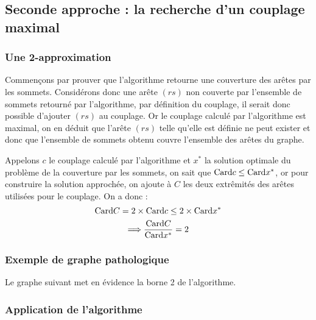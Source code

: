 \subsection{Seconde approche : la recherche d'un couplage maximal}

\subsubsection{Une 2-approximation}

Commençons par prouver que l'algorithme retourne une couverture des arêtes par les sommets.
Considérons donc une arête $(rs)$ non couverte par l'ensemble de sommets retourné par l'algorithme, par
définition du couplage, il serait donc possible d'ajouter $(rs)$ au couplage. Or le couplage calculé
par l'algorithme est maximal, on en déduit que l'arête $(rs)$ telle qu'elle est définie ne peut
exister et donc que l'ensemble de sommets obtenu couvre l'ensemble des arêtes du graphe.

Appelons $c$ le couplage calculé par l'algorithme et $x^*$ la solution optimale du problème de la
couverture par les sommets, on sait que $\mathrm{Card} c \leq \mathrm{Card} x^*$, or pour construire la solution
approchée, on ajoute à $C$ les deux extrêmités des arêtes utilisées pour le couplage. On a donc :$$
\mathrm{Card} C = 2 \times \mathrm{Card} c \leq 2 \times \mathrm{Card} x^*$$ $$\Longrightarrow \frac{\mathrm{Card} C}{\mathrm{Card} x^*} =
2$$

\subsubsection{Exemple de graphe pathologique}

Le graphe suivant met en évidence la borne 2 de l'algorithme.


\subsubsection{Application de l'algorithme}
